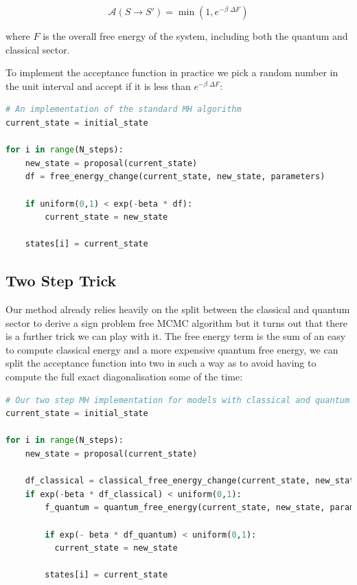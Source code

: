 \[
\mathcal{A}(S \to S') = \min\left(1, e^{-\beta\;\Delta F}\right)
\]

where \(F\) is the overall free energy of the system, including both the quantum and classical sector.

To implement the acceptance function in practice we pick a random number in the unit interval and accept if it is less than \(e^{-\beta\;\Delta F}\):

\begin{lstlisting}[language=Python]
# An implementation of the standard MH algorithm
current_state = initial_state

for i in range(N_steps):
    new_state = proposal(current_state)
    df = free_energy_change(current_state, new_state, parameters)

    if uniform(0,1) < exp(-beta * df):
        current_state = new_state
        
    states[i] = current_state
\end{lstlisting}

\hypertarget{app-mcmc-two-step-trick}{%
\subsection{Two Step Trick}\label{app-mcmc-two-step-trick}}

Our method already relies heavily on the split between the classical and quantum sector to derive a sign problem free MCMC algorithm but it turns out that there is a further trick we can play with it. The free energy term is the sum of an easy to compute classical energy and a more expensive quantum free energy, we can split the acceptance function into two in such a way as to avoid having to compute the full exact diagonalisation some of the time:

\begin{lstlisting}[language=Python]
# Our two step MH implementation for models with classical and quantum energy terms
current_state = initial_state

for i in range(N_steps):
    new_state = proposal(current_state)

    df_classical = classical_free_energy_change(current_state, new_state, parameters)
    if exp(-beta * df_classical) < uniform(0,1):
        f_quantum = quantum_free_energy(current_state, new_state, parameters)
    
        if exp(- beta * df_quantum) < uniform(0,1):
          current_state = new_state
    
        states[i] = current_state
    
\end{lstlisting}

